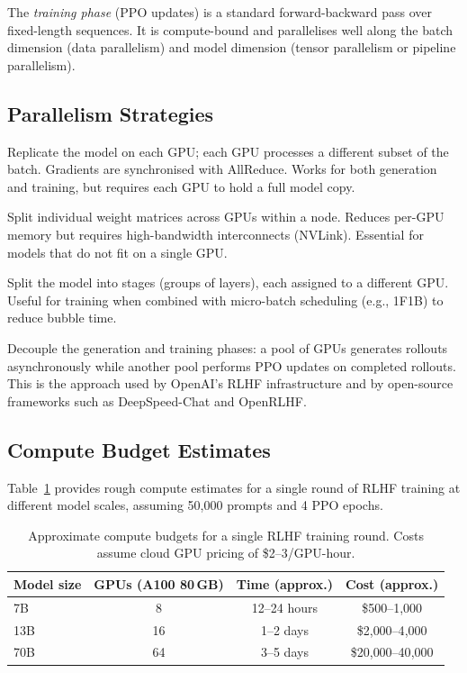 The \emph{training phase} (PPO updates) is a standard forward-backward pass over fixed-length sequences. It is compute-bound and parallelises well along the batch dimension (data parallelism) and model dimension (tensor parallelism or pipeline parallelism).

\subsection{Parallelism Strategies}

\begin{description}[leftmargin=!,labelwidth=3.5cm]
  \item[Data parallelism] Replicate the model on each GPU; each GPU processes a different subset of the batch. Gradients are synchronised with AllReduce. Works for both generation and training, but requires each GPU to hold a full model copy.
  \item[Tensor parallelism] Split individual weight matrices across GPUs within a node. Reduces per-GPU memory but requires high-bandwidth interconnects (NVLink). Essential for models that do not fit on a single GPU.
  \item[Pipeline parallelism] Split the model into stages (groups of layers), each assigned to a different GPU. Useful for training when combined with micro-batch scheduling (e.g., 1F1B) to reduce bubble time.
  \item[Async rollout generation] Decouple the generation and training phases: a pool of GPUs generates rollouts asynchronously while another pool performs PPO updates on completed rollouts. This is the approach used by OpenAI's RLHF infrastructure and by open-source frameworks such as DeepSpeed-Chat and OpenRLHF.
\end{description}

\subsection{Compute Budget Estimates}
\label{sec:compute-budgets}

Table~\ref{tab:compute-budget} provides rough compute estimates for a single round of RLHF training at different model scales, assuming 50{,}000 prompts and 4 PPO epochs.

\begin{table}[ht]
\centering
{\footnotesize
\begin{tabular}{@{}lccc@{}}
\toprule
\textbf{Model size} & \textbf{GPUs (A100 80\,GB)} & \textbf{Time (approx.)} & \textbf{Cost (approx.)} \\
\midrule
7B   & 8   & 12--24 hours & \$500--1{,}000 \\
13B  & 16  & 1--2 days    & \$2{,}000--4{,}000 \\
70B  & 64  & 3--5 days    & \$20{,}000--40{,}000 \\
\bottomrule
\end{tabular}
}
\caption{Approximate compute budgets for a single RLHF training round. Costs assume cloud GPU pricing of \$2--3/GPU-hour.}
\label{tab:compute-budget}
\end{table}

